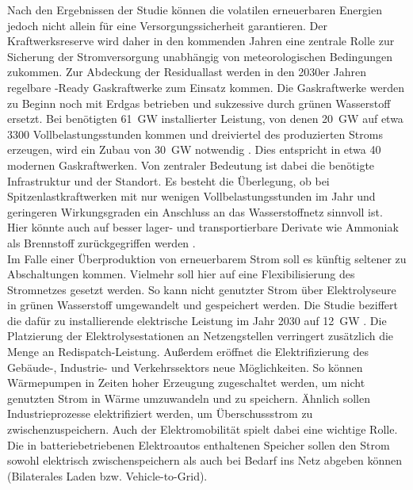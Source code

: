 		Nach den Ergebnissen der Studie können die volatilen erneuerbaren Energien jedoch nicht allein für eine Versorgungssicherheit garantieren. 
		Der Kraftwerksreserve wird daher in den kommenden Jahren eine zentrale Rolle zur Sicherung der Stromversorgung unabhängig von meteorologischen Bedingungen zukommen. 
		Zur Abdeckung der Residuallast werden in den 2030er Jahren regelbare \Htwo-Ready Gaskraftwerke zum Einsatz kommen. 		 
		Die Gaskraftwerke werden zu Beginn noch mit Erdgas betrieben und sukzessive durch grünen Wasserstoff ersetzt. 
		Bei benötigten \SI{61}{\giga\watt} installierter Leistung, von denen \SI{20}{\giga\watt} auf etwa 3300 Vollbelastungsstunden kommen und dreiviertel des produzierten Stroms erzeugen, wird ein Zubau von \SI{30}{\giga\watt} notwendig \cite[S.9]{Agora_KlimaneutralesStromsystem}.  
		Dies entspricht in etwa 40 modernen Gaskraftwerken. 
		Von zentraler Bedeutung ist dabei die benötigte Infrastruktur und der Standort. 
		Es besteht die Überlegung, ob bei Spitzenlastkraftwerken mit nur wenigen Vollbelastungsstunden im Jahr und geringeren Wirkungsgraden ein Anschluss an das Wasserstoffnetz sinnvoll ist.
		Hier könnte auch auf besser lager- und transportierbare Derivate wie Ammoniak als Brennstoff zurückgegriffen werden \cite[S.17]{Agora_KlimaneutralesStromsystem}. \\
		
		
		Im Falle einer Überproduktion von erneuerbarem Strom soll es künftig seltener zu Abschaltungen kommen. 
		Vielmehr soll hier auf eine Flexibilisierung des Stromnetzes gesetzt werden.
		So kann nicht genutzter Strom über Elektrolyseure in grünen Wasserstoff umgewandelt und gespeichert werden. 
		Die Studie beziffert die dafür zu installierende elektrische Leistung im Jahr 2030 auf \SI{12}{\giga\watt} \cite[S.11]{Agora_KlimaneutralesStromsystem}.
		Die Platzierung der Elektrolysestationen an Netzengstellen verringert zusätzlich die Menge an Redispatch-Leistung. 
		Außerdem eröffnet die Elektrifizierung des Gebäude-, Industrie- und Verkehrssektors neue Möglichkeiten. 
		So können Wärmepumpen in Zeiten hoher Erzeugung zugeschaltet werden, um nicht genutzten Strom in Wärme umzuwandeln und zu speichern. 
		Ähnlich sollen Industrieprozesse elektrifiziert werden, um Überschussstrom zu zwischenzuspeichern. 
		Auch der Elektromobilität spielt dabei eine wichtige Rolle. 
		Die in batteriebetriebenen Elektroautos enthaltenen Speicher sollen den Strom sowohl elektrisch zwischenspeichern als auch bei Bedarf ins Netz abgeben können (Bilaterales Laden bzw. Vehicle-to-Grid). 
		
